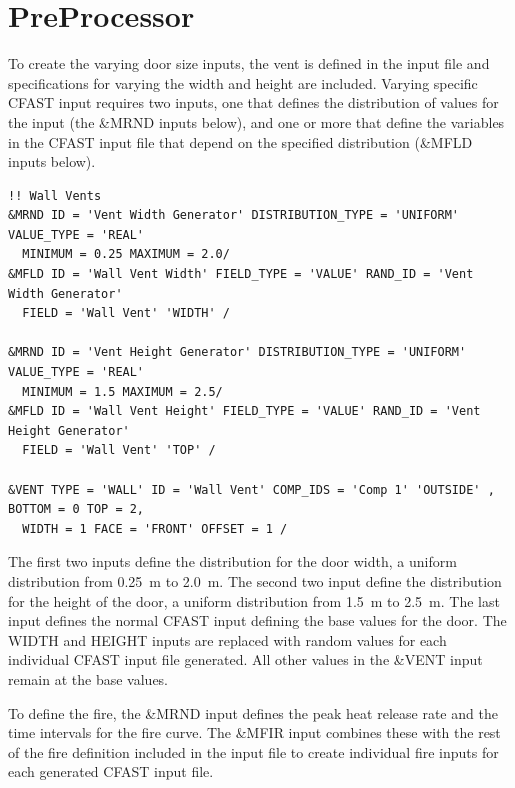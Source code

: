 \documentclass[12pt,twoside]{book}
\begin{document}
\section{PreProcessor}
\label{preprocessor}

To create the varying door size inputs, the vent is defined in the input file and specifications for varying the width and height are included. Varying specific CFAST input requires two inputs, one that defines the distribution of values for the input (the {\ct \&MRND} inputs below), and one or more that define the variables in the CFAST input file that depend on the specified distribution ({\ct \&MFLD} inputs below).

\begin{lstlisting}[basicstyle=\scriptsize]
!! Wall Vents
&MRND ID = 'Vent Width Generator' DISTRIBUTION_TYPE = 'UNIFORM' VALUE_TYPE = 'REAL'
  MINIMUM = 0.25 MAXIMUM = 2.0/
&MFLD ID = 'Wall Vent Width' FIELD_TYPE = 'VALUE' RAND_ID = 'Vent Width Generator'
  FIELD = 'Wall Vent' 'WIDTH' /

&MRND ID = 'Vent Height Generator' DISTRIBUTION_TYPE = 'UNIFORM' VALUE_TYPE = 'REAL'
  MINIMUM = 1.5 MAXIMUM = 2.5/
&MFLD ID = 'Wall Vent Height' FIELD_TYPE = 'VALUE' RAND_ID = 'Vent Height Generator'
  FIELD = 'Wall Vent' 'TOP' /

&VENT TYPE = 'WALL' ID = 'Wall Vent' COMP_IDS = 'Comp 1' 'OUTSIDE' , BOTTOM = 0 TOP = 2,
  WIDTH = 1 FACE = 'FRONT' OFFSET = 1 /
\end{lstlisting}

The first two inputs define the distribution for the door width, a uniform distribution from 0.25~m to 2.0~m. The second two input define the distribution for the height of the door, a uniform distribution from 1.5~m to 2.5~m. The last input defines the normal CFAST input defining the base values for the door. The {\ct WIDTH} and {\ct HEIGHT} inputs are replaced with random values for each individual CFAST input file generated. All other values in the {\ct \&VENT} input remain at the base values.

To define the fire, the {\ct \&MRND} input defines the peak heat release rate and the time intervals for the fire curve. The {\ct \&MFIR} input combines these with the rest of the fire definition included in the input file to create individual fire inputs for each generated CFAST input file.
\end{document}
